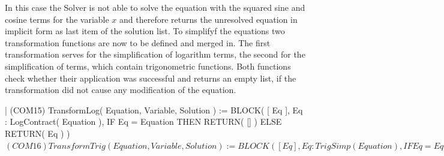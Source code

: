 
In this case the Solver is not able to solve the equation with the squared sine and cosine terms for the variable $x$ and therefore returns  the unresolved equation in implicit form as last item of the solution list. 
To simplifyf the equations two transformation functions are now to be defined and merged in. The first transformation serves for the simplification of logarithm terms, the second for the simplification of terms, which contain trigonometric functions. Both functions check whether their application was successful and returns an empty list, if the transformation did not cause any modification of the equation.
\begin{literatim}{|}
(COM15) TransformLog( Equation, Variable, Solution ) := BLOCK(
  [ Eq ],
  Eq : LogContract( Equation ),
  IF Eq = Equation THEN
    RETURN( [] )
  ELSE
    RETURN( Eq )
)$

(COM16) TransformTrig( Equation, Variable, Solution ) := BLOCK(
  [ Eq ],
  Eq : TrigSimp( Equation ),
  IF Eq = Equation THEN
    RETURN( [] )
  ELSE
    RETURN( Eq )
)$
\end{literatim} 

